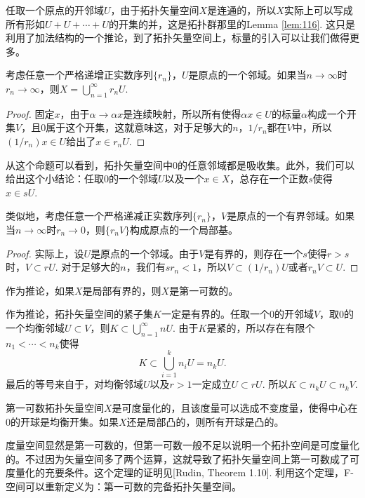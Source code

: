\begin{para}\label{1.31}
任取一个原点的开邻域$U$，由于拓扑矢量空间$X$是连通的，所以$X$实际上可以写成所有形如$U+U+\cdots+U$的开集的并，这是拓扑群那里的Lemma \ref{lem:116}. 这只是利用了加法结构的一个推论，到了拓扑矢量空间上，标量的引入可以让我们做得更多。
\begin{compactenum}[(a)]
\item 考虑任意一个严格递增正实数序列$\{r_n\}$，$U$是原点的一个邻域。如果当$n\to \infty$时$r_n\to \infty$，则$X=\bigcup_{n=1}^\infty r_n U$.

\begin{proof}
	固定$x$，由于$\alpha\to \alpha x$是连续映射，所以所有使得$\alpha x\in U$的标量$\alpha$构成一个开集$V$，且$0$属于这个开集，这就意味这，对于足够大的$n$，$1/r_n$都在$V$中，所以$(1/r_n) x\in U$给出了$x\in r_n U$.
\end{proof}

从这个命题可以看到，拓扑矢量空间中$0$的任意邻域都是吸收集。此外，我们可以给出这个小结论：任取$0$的一个邻域$U$以及一个$x\in X$，总存在一个正数$s$使得$x\in sU$.

\item 类似地，考虑任意一个严格递减正实数序列$\{r_n\}$，$V$是原点的一个有界邻域。如果当$n\to \infty$时$r_n\to 0$，则$\{r_n V\}$构成原点的一个局部基。

\begin{proof}
	实际上，设$U$是原点的一个邻域。由于$V$是有界的，则存在一个$s$使得$r>s$时，$V\subset rU$. 对于足够大的$n$，我们有$sr_n<1$，所以$V\subset (1/r_n)U$或者$r_n V\subset U$.
\end{proof}

作为推论，如果$X$是局部有界的，则$X$是第一可数的。
\end{compactenum}
\end{para}

作为推论，拓扑矢量空间的紧子集$K$一定是有界的。任取一个$0$的开邻域$V$，取$0$的一个均衡邻域$U\subset V$，则$K\subset \bigcup_{n=1}^\infty nU$. 由于$K$是紧的，所以存在有限个$n_1< \cdots <n_k$使得
\[
	K\subset \bigcup_{i=1}^k n_iU=n_k U.
\]
最后的等号来自于，对均衡邻域$U$以及$r>1$一定成立$U\subset rU$. 所以$K\subset n_k U\subset n_k V$.

\begin{thm}
第一可数拓扑矢量空间$X$是可度量化的，且该度量可以选成不变度量，使得中心在$0$的开球是均衡开集。如果$X$还是局部凸的，则所有开球是凸的。
\end{thm}

度量空间显然是第一可数的，但第一可数一般不足以说明一个拓扑空间是可度量化的。不过因为矢量空间多了两个运算，这就导致了拓扑矢量空间上第一可数成了可度量化的充要条件。这个定理的证明见[Rudin, Theorem 1.10]. 利用这个定理，F-空间可以重新定义为：第一可数的完备拓扑矢量空间。

